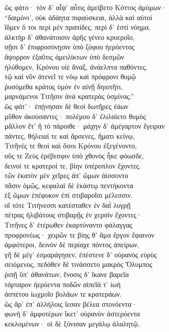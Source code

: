 \quad{}ὣς φάτο· τὸν δ' αἶψ' αὖτις ἀμείβετο Κόττος ἀμύμων· \\
``δαιμόνι', οὐκ ἀδάητα πιφαύσκεαι, ἀλλὰ καὶ αὐτοὶ  \\
ἴδμεν ὅ τοι περὶ μὲν πραπίδες, περὶ δ' ἐστὶ νόημα,\\
ἀλκτὴρ δ' ἀθανάτοισιν ἀρῆς γένεο κρυεροῖο, \\
σῇσι δ' ἐπιφροσύνῃσιν ὑπὸ ζόφου ἠερόεντος\\
ἄψορρον ἐξαῦτις ἀμειλίκτων ὑπὸ δεσμῶν\\
ἠλύθομεν, Κρόνου υἱὲ ἄναξ, ἀνάελπτα παθόντες. \\
τῷ καὶ νῦν ἀτενεῖ τε νόῳ καὶ πρόφρονι θυμῷ\\
ῥυσόμεθα κράτος ὑμὸν ἐν αἰνῇ δηιοτῆτι, \\
μαρνάμενοι Τιτῆσιν ἀνὰ κρατερὰς ὑσμίνας.'' \\
ὣς φάτ'· ἐπῄνησαν δὲ θεοὶ δωτῆρες ἐάων \\
μῦθον ἀκούσαντες· πολέμου δ' ἐλιλαίετο θυμὸς  \\
μᾶλλον ἔτ' ἢ τὸ πάροιθε· μάχην δ' ἀμέγαρτον ἔγειραν \\
πάντες, θήλειαί τε καὶ ἄρσενες, ἤματι κείνῳ,\\
Τιτῆνές τε θεοὶ καὶ ὅσοι Κρόνου ἐξεγένοντο,\\
οὕς τε Ζεὺς ἐρέβεσφιν ὑπὸ χθονὸς ἧκε φόωσδε,\\
δεινοί τε κρατεροί τε, βίην ὑπέροπλον ἔχοντες. \\
τῶν ἑκατὸν μὲν χεῖρες ἀπ' ὤμων ἀίσσοντο\\
πᾶσιν ὁμῶς, κεφαλαὶ δὲ ἑκάστῳ πεντήκοντα\\
ἐξ ὤμων ἐπέφυκον ἐπὶ στιβαροῖσι μέλεσσιν.\\
οἳ τότε Τιτήνεσσι κατέσταθεν ἐν δαῒ λυγρῇ\\
πέτρας ἠλιβάτους στιβαρῇς ἐν χερσὶν ἔχοντες·  \\
Τιτῆνες δ' ἑτέρωθεν ἐκαρτύναντο φάλαγγας\\
προφρονέως· χειρῶν τε βίης θ' ἅμα ἔργον ἔφαινον \\
ἀμφότεροι, δεινὸν δὲ περίαχε πόντος ἀπείρων,\\
γῆ δὲ μέγ' ἐσμαράγησεν, ἐπέστενε δ' οὐρανὸς εὐρὺς\\
σειόμενος, πεδόθεν δὲ τινάσσετο μακρὸς Ὄλυμπος \\
ῥιπῇ ὕπ' ἀθανάτων, ἔνοσις δ' ἵκανε βαρεῖα\\
τάρταρον ἠερόεντα ποδῶν αἰπεῖά τ' ἰωὴ\\
ἀσπέτου ἰωχμοῖο βολάων τε κρατεράων. \\
ὣς ἄρ' ἐπ' ἀλλήλοις ἵεσαν βέλεα στονόεντα· \\
φωνὴ δ' ἀμφοτέρων ἵκετ' οὐρανὸν ἀστερόεντα \\
κεκλομένων· οἱ δὲ ξύνισαν μεγάλῳ ἀλαλητῷ. 

